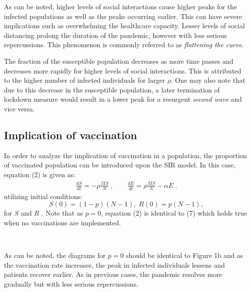 \documentclass[12pt]{article}
\begin{document}
\noindent As can be noted, higher levels of social interactions cause higher peaks for the infected populations as well as the peaks occurring earlier. This can have severe implications such as overwhelming the healthcare capacity. Lesser levels of social distancing prolong the duration of the pandemic, however with less serious repercussions. 
This phenomenon is commonly referred to as \textit{flattening the curve}.

The fraction of the susceptible population decreases as more time passes and decreases more rapidly for higher levels of social interactions. 
\newpage 
\noindent This is attributed to the higher number of infected individuals for larger $\rho$. One may also note that due to this decrease in the susceptible population, a later termination of lockdown measure would result in a lower peak for a resurgent \textit{second wave} and vice versa.

\subsection{Implication of vaccination}
In order to analyze the implication of vaccination in a population, the proportion of vaccinated population can be introduced upon the SIR model. In this case, equation (2) is given as:
\begin{gather}
\frac{dS}{dt} = - \rho\frac{\beta I S}{N} \;, \qquad
\frac{dE}{dt} = \rho\frac{\beta I S}{N}- \alpha E \;.
\end{gather}
utilizing initial conditions:
\begin{equation}
S(0) = (1-p)(N-1), \; R(0) = p(N-1),  
\end{equation}
for $S$ and $R$ \cite{ashraf}. Note that as $p = 0$, equation (2) is identical to (7) which holds true when no vaccinations are implemented. 

\begin{figure*}[ht!]
\begin{center}
   \\
   \caption{\label{workflow} (a) 40 \% vaccination rate (b) 50 \% vaccination rate}
\end{center}
\end{figure*}
\noindent As can be noted, the diagrams for $p = 0$ should be identical to Figure 1b and as the vaccination rate increases, the peak in infected individuals lessens and patients recover earlier. As in previous cases, the pandemic resolves more gradually but with less serious repercussions.
\end{document}
